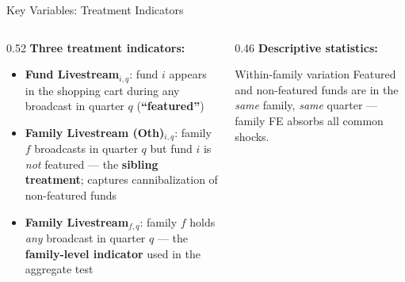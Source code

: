 \documentclass[11pt, aspectratio=169]{beamer}
\newcommand{\hl}[1]{\textcolor{myblue}{\textbf{#1}}}
\begin{document}
\begin{frame}{Key Variables: Treatment Indicators}

\begin{columns}[T]
\begin{column}{0.52\textwidth}
\textbf{Three treatment indicators:}

\medskip
\begin{itemize}\addtolength{\itemsep}{8pt}
  \item \textbf{Fund Livestream}$_{i,q}$: fund $i$ appears in
  the shopping cart during any broadcast in quarter $q$
  (\hl{``featured''})

  \item \textbf{Family Livestream (Oth)}$_{i,q}$: family $f$
  broadcasts in quarter $q$ but fund $i$ is \emph{not}
  featured --- the \hl{sibling treatment}; captures
  cannibalization of non-featured funds

  \item \textbf{Family Livestream}$_{f,q}$: family $f$ holds
  \emph{any} broadcast in quarter $q$ --- the
  \hl{family-level indicator} used in the aggregate test
\end{itemize}
\end{column}
\begin{column}{0.46\textwidth}
\textbf{Descriptive statistics:}

\medskip
{}

\vspace{0.3cm}
\begin{alertblock}{Within-family variation}
  Featured and non-featured funds are in the \emph{same}
  family, \emph{same} quarter --- family FE absorbs
  all common shocks.
\end{alertblock}
\end{column}
\end{columns}

\end{frame}
\end{document}
